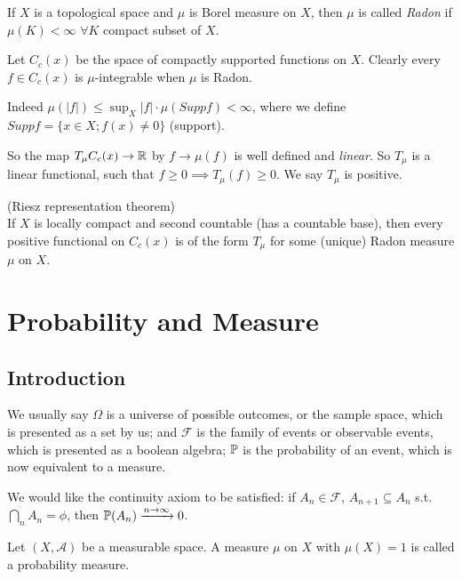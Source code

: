 \documentclass[a4paper]{article}
\begin{document}
\begin{defi}
If $X$ is a topological space and $\mu$ is Borel measure on $X$, then $\mu$ is called \emph{Radon} if $\mu(K) < \infty$ $\forall K$ compact subset of $X$.

Let $C_c(x)$ be the space of compactly supported functions on $X$. Clearly every $f \in C_c(x)$ is $\mu$-integrable when $\mu$ is Radon.

Indeed $\mu(|f|) \leq \sup_X |f| \cdot \mu (Supp f) < \infty$, where we define $Supp f = \{x \in X; f(x) \neq 0\}$ (support).

So the map $T_\mu C_c(x) \to \R$ by $f \to \mu(f)$ is well defined and \emph{linear}. So $T_\mu$ is a linear functional, such that $f \geq 0 \implies T_\mu(f) \geq 0$. We say $T_\mu$ is positive.
\end{defi}

\begin{thm} (Riesz representation theorem)\\
If $X$ is locally compact and second countable (has a countable base), then every positive functional on $C_c(x)$ is of the form $T_\mu$ for some (unique) Radon measure $\mu$ on $X$.
\end{thm}

\newpage

\section{Probability and Measure}

\subsection{Introduction}

We usually say $\Omega$ is a universe of possible outcomes, or the sample space, which is presented as a set by us; and $\mathcal{F}$ is the family of events or observable events, which is presented as a boolean algebra; $\P$ is the probability of an event, which is now equivalent to a measure.

We would like the continuity axiom to be satisfied: if $A_n \in \mathcal{F}$, $A_{n+1} \subseteq A_n$ s.t. $\bigcap_n A_n = \phi$, then $\P(A_n) \xrightarrow{n \to \infty} 0$.

\begin{defi}
Let $(X,\mathcal{A})$ be a measurable space. A measure $\mu$ on $X$ with $\mu(X) = 1$ is called a probability measure.
\end{defi}
\end{document}
